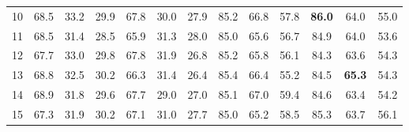 \begin{table}[t]
{\begin{tabular}{c c c c| c c c| c c c| c c c}
            10 & 68.5 & 33.2 & 29.9 & 67.8 & 30.0 & 27.9 & 85.2 & 66.8 & 57.8 & \textbf{86.0} & 64.0 & 55.0 \\
            11 & 68.5 & 31.4 & 28.5 & 65.9 & 31.3 & 28.0 & 85.0 & 65.6 & 56.7 & 84.9 & 64.0 & 53.6 \\
            12 & 67.7 & 33.0 & 29.8 & 67.8 & 31.9 & 26.8 & 85.2 & 65.8 & 56.1 & 84.3 & 63.6 & 54.3 \\
            13 & 68.8 & 32.5 & 30.2 & 66.3 & 31.4 & 26.4 & 85.4 & 66.4 & 55.2 & 84.5 & \textbf{65.3} & 54.3 \\
            14 & 68.9 & 31.8 & 29.6 & 67.7 & 29.0 & 27.0 & 85.1 & 67.0 & 59.4 & 84.6 & 63.4 & 54.2 \\
            15 & 67.3 & 31.9 & 30.2 & 67.1 & 31.0 & 27.7 & 85.0 & 65.2 & 58.5 & 85.3 & 63.7 & 56.1 \\
                                  
        \bottomrule
    \end{tabular}
    }
    \label{tab:fine_tuning_distal}
\end{table}

